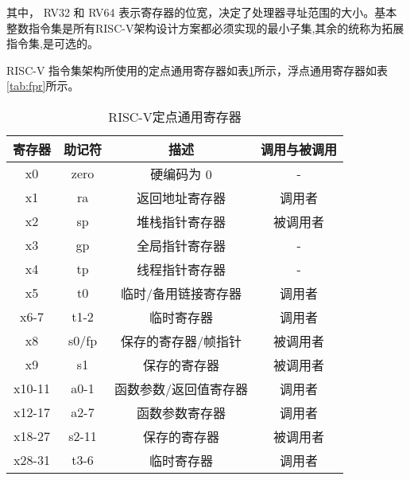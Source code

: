 其中， RV32 和 RV64 表示寄存器的位宽，决定了处理器寻址范围的大小。基本整数指令集是所有RISC-V架构设计方案都必须实现的最小子集,其余的统称为拓展指令集,是可选的。


RISC-V 指令集架构所使用的定点通用寄存器如表\ref{tab:xpr}所示，浮点通用寄存器如表\ref{tab:fpr}所示。
\begin{table}[H]
  \centering
  \caption{RISC-V定点通用寄存器}
  \label{tab:xpr}
  \begin{tabular}{cccc}
    \toprule
寄存器 &	助记符	& 描述 &	调用与被调用\\
    \midrule
    x0 & zero & 硬编码为 0 & -\\
    x1 & ra & 返回地址寄存器 & 调用者\\
    x2 & sp & 堆栈指针寄存器 & 被调用者\\
    x3 & gp & 全局指针寄存器 & -\\
    x4 & tp & 线程指针寄存器 & -\\
    x5 & t0 & 临时/备用链接寄存器 & 调用者\\
    x6-7 & t1-2 & 临时寄存器 & 调用者\\
    x8 & s0/fp & 保存的寄存器/帧指针 & 被调用者\\
    x9 & s1 & 保存的寄存器 & 被调用者\\
    x10-11 & a0-1 & 函数参数/返回值寄存器 & 调用者\\
    x12-17 & a2-7 & 函数参数寄存器 & 调用者\\
    x18-27 & s2-11 & 保存的寄存器 & 被调用者\\
    x28-31	& t3-6 & 临时寄存器 & 调用者\\
    \bottomrule
  \end{tabular}
\end{table}


